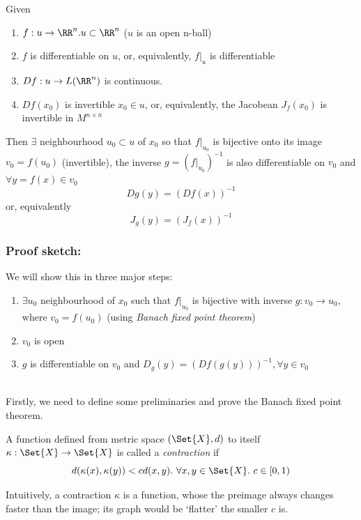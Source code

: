 \begin{thm}
  \label{thm:InvFT}
  Given
  \begin{enumerate}
  \item $f: u \to \RR^n. u \subset \RR^n$ ($u$ is an open n-ball)
  \item $f$ is differentiable on $u$, or, equivalently, $f|_u$ is differentiable
  \item $Df: u \to L(\RR^n)$ is continuous.
  \item $Df(x_0)$ is invertible $x_0 \in u$, or, equivalently, the Jacobean $J_f(x_0)$ is invertible in $M^{n\times n}$
  \end{enumerate}
  Then $\exists$ neighbourhood $u_0 \subset u$ of $x_0$ so that $f|_{u_0}$ is bijective onto its image $v_0 = f(u_0)$ (invertible), the inverse $g = (f|_{u_0})^{-1}$ is also differentiable on $v_0$ and $\forall y = f(x) \in v_0$
  $$Dg(y) = (Df(x))^{-1}$$
  or, equivalently
  $$J_g(y) = (J_f(x))^{-1}$$
\end{thm}

\subsubsection*{Proof sketch:}
We will show this in three major steps: 
\begin{enumerate}[I]
\item $\exists u_0$ neighbourhood of $x_0$ such that $f|_{u_0}$ is bijective with inverse $g: v_0 \rightarrow u_0$, where $v_0 = f(u_0)$ (using \emph{Banach fixed point theorem})
\item $v_0$ is open
\item $g$ is differentiable on $v_0$ and $D_g(y) = (Df(g(y)))^{-1}, \forall y \in v_0$
\end{enumerate}
\ \\

Firstly, we need to define some preliminaries and prove the Banach fixed point theorem. 


\begin{defn}
  A function defined from metric space $(\Set{X}, d)$ to itself $\kappa: \Set{X} \rightarrow \Set{X}$ is called a \emph{contraction} if
  $$d(\kappa(x), \kappa(y)) < cd(x,y).\ \forall x, y \in \Set{X}.\ c \in [0, 1)$$
\end{defn}

\begin{rem}
  Intuitively, a contraction $\kappa$ is a function, whose the preimage always changes faster than the image; its graph would be `flatter' the smaller $c$ is.
\end{rem}

